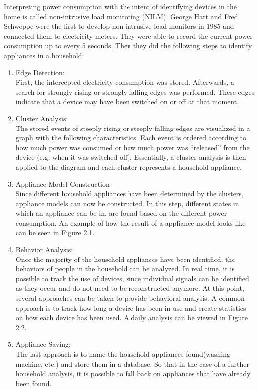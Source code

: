 Interpreting power consumption with the intent of identifying devices in the home is called non-intrusive load monitoring (NILM). George Hart and Fred Schweppe were the first to develop non-intrusive load monitors in 1985 and connected them to electricity meters. They were able to record the current power consumption up to every 5 seconds. Then they did the following steps to identify appliances in a household:
\begin{enumerate}
\item Edge Detection:\\
First, the intercepted electricity consumption was stored. Afterwards, a search for strongly rising or strongly falling edges was performed. These edges indicate that a device may have been switched on or off at that moment.
\item Cluster Analysis:\\ 
The stored events of steeply rising or steeply falling edges are visualized in a graph with the following characteristics. Each event is ordered according to how much power was consumed or how much power was 	``released'' from the device (e.g. when it was switched off). 
Essentially, a cluster analysis is then applied to the diagram and each  cluster represents a household appliance.
\item Appliance Model Construction\\
Since different household appliances have been determined by the clusters, appliance models can now be constructed. In this step, different states in which an appliance can be in, are found based on the different power consumption. An example of how the result of a appliance model looks like can be seen in Figure 2.1.
\item Behavior Analysis:\\
Once the majority of the household appliances have been identified, the behaviors of people in the household can be analyzed. In real time, it is possible to track the use of devices, since individual signals can be identified as they occur and do not need to be reconstructed anymore.
At this point, several approaches can be taken to provide behavioral analysis. A common approach is to track how long a device has been in use and create statistics on how each device has been used. A daily analysis can be viewed in Figure 2.2.
\item Appliance Saving:\\
The last approach is to name the household appliances found(washing machine, etc.) and store them in a database. So that in the case of a further household analysis, it is possible to fall back on appliances that have already been found.
\end{enumerate}
